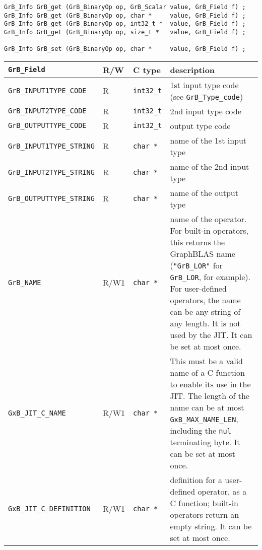 \begin{mdframed}[userdefinedwidth=6in]
{\footnotesize
\begin{verbatim}
GrB_Info GrB_get (GrB_BinaryOp op, GrB_Scalar value, GrB_Field f) ;
GrB_Info GrB_get (GrB_BinaryOp op, char *     value, GrB_Field f) ;
GrB_Info GrB_get (GrB_BinaryOp op, int32_t *  value, GrB_Field f) ;
GrB_Info GrB_get (GrB_BinaryOp op, size_t *   value, GrB_Field f) ;

GrB_Info GrB_set (GrB_BinaryOp op, char *     value, GrB_Field f) ;
\end{verbatim}
}\end{mdframed}

\noindent
{\small
\begin{tabular}{|l|l|l|p{2.8in}|}
\hline
\verb'GrB_Field'                    & R/W  & C type        & description \\
\hline
\verb'GrB_INPUT1TYPE_CODE'          & R    & \verb'int32_t'& 1st input type code (see \verb'GrB_Type_code') \\
\verb'GrB_INPUT2TYPE_CODE'          & R    & \verb'int32_t'& 2nd input type code \\
\verb'GrB_OUTPUTTYPE_CODE'          & R    & \verb'int32_t'& output type code \\
\verb'GrB_INPUT1TYPE_STRING'        & R    & \verb'char *' & name of the 1st input type \\
\verb'GrB_INPUT2TYPE_STRING'        & R    & \verb'char *' & name of the 2nd input type \\
\verb'GrB_OUTPUTTYPE_STRING'        & R    & \verb'char *' & name of the output type \\
\hline
\verb'GrB_NAME'                     & R/W1 & \verb'char *' &    %
    name of the operator.  For built-in operators, this returns the GraphBLAS
    name (\verb'"GrB_LOR"' for \verb'GrB_LOR', for example).
    For user-defined operators, the name can be any string of any length.  It
    is not used by the JIT.  It can be set at most once. \\
\verb'GxB_JIT_C_NAME'               & R/W1 & \verb'char *' &
    This must be a valid name of a C function to enable its use in the JIT.
    The length of the name can be at most \verb'GxB_MAX_NAME_LEN', including
    the \verb'nul' terminating byte.  It can be set at most once. \\
\verb'GxB_JIT_C_DEFINITION'         & R/W1 & \verb'char *' &
    definition for a user-defined operator, as a C function; built-in operators
    return an empty string.  It can be set at most once. \\
\hline
\end{tabular}
}

